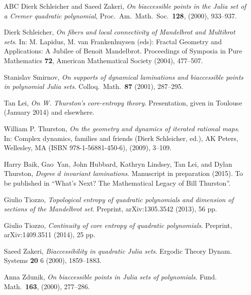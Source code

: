 \documentclass[12pt]{amsart}
\newcommand{\0}{\texttt{0}}
\newcommand{\1}{\texttt{1}}
\theoremstyle{definition}
\numberwithin{equation}{section}
\newcounter{reminder}[section]
\newcounter{treminder}
\begin{document}
\begin{thebibliography}{ABC}
 Dierk Schleicher and Saeed Zakeri, 
\emph{On biaccessible points in the Julia set of a Cremer quadratic polynomial},
   Proc.~Am.~Math.~Soc.~\textbf{128}, (2000), 933--937.

 Dierk Schleicher, 
\emph{On fibers and local connectivity of Mandelbrot and Multibrot sets}. In:
  M. Lapidus, M. van Frankenhuysen (eds): Fractal Geometry and Applications:
  A Jubilee of Benoit Mandelbrot. Proceedings of Symposia in Pure Mathematics
  \textbf{72}, American Mathematical Society (2004), 477--507. 

 Stanislav Smirnov, \emph{On supports of dynamical laminations
   and biaccessible points in polynomial Julia sets}. Colloq.~Math.~\textbf{87}   (2001), 287--295.

 Tan Lei,
  \emph{On W. Thurston's core-entropy theory}. Presentation, given in Toulouse
  (January 2014) and elsewhere.

 William P. Thurston,
   \emph{On the geometry and dynamics of iterated rational maps}. In:
   Complex dynamics, families and friends (Dierk Schleicher, ed.), AK Peters,
   Wellesley, MA (ISBN 978-1-56881-450-6),  (2009),  3--109.

 Harry Baik, Gao~Yan, John Hubbard, Kathryn Lindsey,
  Tan Lei, and Dylan Thurston, \emph{Degree $d$ invariant laminations}. Manuscript in preparation (2015). To be published in ``What's Next? The Mathematical Legacy of Bill Thurston''.

 Giulio Tiozzo, \emph{Topological entropy of
   quadratic polynomials and dimension of sections of the Mandelbrot set}.
   Preprint, arXiv:1305.3542 (2013), 56 pp.

 Giulio Tiozzo, \emph{Continuity of core entropy of
   quadratic polynomials}. Preprint, arXiv:1409.3511 (2014), 25 pp.

 Saeed Zakeri, 
\emph{Biaccessibility in quadratic Julia sets}. 
Ergodic Theory Dynam. Systems \textbf{20} 6 (2000), 1859--1883. 

 Anna Zdunik, \emph{On biaccessible points in Julia sets of polynomials}. Fund. Math.~\textbf{163}, (2000), 277--286.
\end{thebibliography}



\vskip-0.8mm
\end{document}

